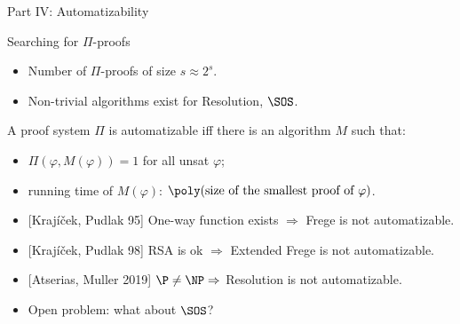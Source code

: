 \begin{frame}

    \begin{center}
        \Huge Part IV: Automatizability
    \end{center}
    
\end{frame}

\begin{frame}{Searching for $\Pi$-proofs}

    \begin{itemize}
        \item Number of $\Pi$-proofs of size $s \approx 2^s$.
        \item Non-trivial algorithms exist for Resolution, $\SOS$. 
    \end{itemize}

    \pause
    \begin{definition}
        A proof system $\Pi$ is automatizable iff there is an algorithm $M$ such that:
        \begin{itemize}
            \item $\Pi(\varphi, M(\varphi)) = 1$ for all unsat $\varphi$;
            \item running time of $M(\varphi)$: $\poly(\text{size of
                the smallest proof of $\varphi$})$.
        \end{itemize}
    \end{definition}

    \vspace{0.2cm}
    \pause
    \begin{itemize}
        \item{} [Kraj{\'{i}}{\v{c}}ek, Pudlak 95] One-way function
            exists $\Rightarrow$ Frege is not automatizable.
            \pause
        \item{} [Kraj{\'{i}}{\v{c}}ek, Pudlak 98] RSA is ok
            $\Rightarrow$ Extended Frege is not automatizable.
            \pause
        \item{} [Atserias, Muller 2019] $\P \neq \NP \Rightarrow$
            Resolution is not automatizable.
            \pause
        \item{} \alert{Open problem:} what about $\SOS$?
    \end{itemize}
    
\end{frame}